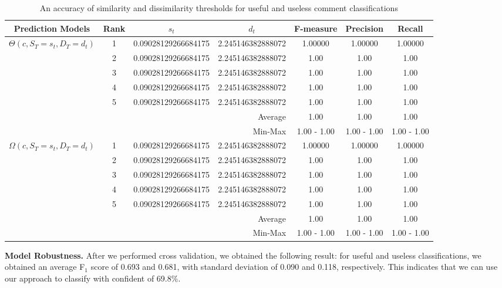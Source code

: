 \begin{table*}[!t]
\caption{An accuracy of similarity and dissimilarity thresholds for useful and useless comment classifications}
\small
\centering
\def\arraystretch{1.2}
\begin{tabular}{ccccccc}
\hline
Prediction Models  & Rank & $s_t$ & $d_t$ & F-measure & Precision & Recall \\ \hline \hline
\multirow{7}{*}{$\Theta(c,S_T=s_t,D_T=d_t)$} & 1 & 0.09028129266684175 & 2.245146382888072 &  1.00000 & 1.00000 & 1.00000 \\ \cline{2-7}
& 2 & 0.09028129266684175 & 2.245146382888072 &  1.00 & 1.00 & 1.00 \\ \cline{2-7}
& 3 & 0.09028129266684175 & 2.245146382888072 &  1.00 & 1.00& 1.00 \\ \cline{2-7}
& 4 & 0.09028129266684175 & 2.245146382888072 &  1.00 & 1.00 & 1.00 \\ \cline{2-7}
& 5 & 0.09028129266684175 & 2.245146382888072 &  1.00 & 1.00 & 1.00 \\ \cline{2-7}
& \multicolumn{3}{r}{Average} &  1.00 & 1.00 & 1.00 \\ \cline{2-7}
& \multicolumn{3}{r}{Min-Max} &   1.00 - 1.00 & 1.00 - 1.00  & 1.00 - 1.00  \\ \hline \hline
\multirow{7}{*}{$\Omega(c,S_T=s_t,D_T=d_t)$} & 1 & 0.09028129266684175 & 2.245146382888072 &  1.00000 & 1.00000 & 1.00000 \\ \cline{2-7}
& 2 & 0.09028129266684175 & 2.245146382888072 &  1.00 & 1.00 & 1.00 \\ \cline{2-7}
& 3 & 0.09028129266684175 & 2.245146382888072 &  1.00 & 1.00& 1.00 \\ \cline{2-7}
& 4 & 0.09028129266684175 & 2.245146382888072 &  1.00 & 1.00 & 1.00 \\ \cline{2-7}
& 5 & 0.09028129266684175 & 2.245146382888072 &  1.00 & 1.00 & 1.00 \\ \cline{2-7}
& \multicolumn{3}{r}{Average} &  1.00 & 1.00 & 1.00 \\ \cline{2-7}
& \multicolumn{3}{r}{Min-Max} &   1.00 - 1.00 & 1.00 - 1.00  & 1.00 - 1.00  \\ \hline
\end{tabular}
\label{tb:thresholds}
\end{table*}

\textbf{Model Robustness.} After we performed cross validation, we obtained the following result:
for useful and useless classifications,
we obtained an average F$_1$ score of 0.693 and 0.681,
with standard deviation of 0.090 and 0.118, respectively.
This indicates that we can use our approach to classify with confident of 69.8\%.

